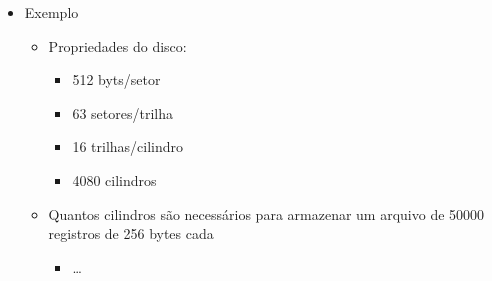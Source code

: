 \documentclass[12pt]{article}
\begin{document}
\begin{itemize}
\begin{itemize}
\begin{itemize}
                \[
                \text{Capacidade do cilindro} \times \text{Número de cilindros} 
                \]
            \end{itemize}
            \item Exemplo
            \begin{itemize}
                \item Propriedades do disco:
                \begin{itemize}
                    \item 512 byts/setor
                    \item 63 setores/trilha
                    \item 16 trilhas/cilindro
                    \item 4080 cilindros
                \end{itemize}
                \item Quantos cilindros são necessários para armazenar um 
                arquivo de 50000 registros de 256 bytes cada
                \begin{itemize}[label=R:]
                    \item \dots


\end{itemize}
\end{itemize}
\end{itemize}
\end{itemize}
\end{document}
